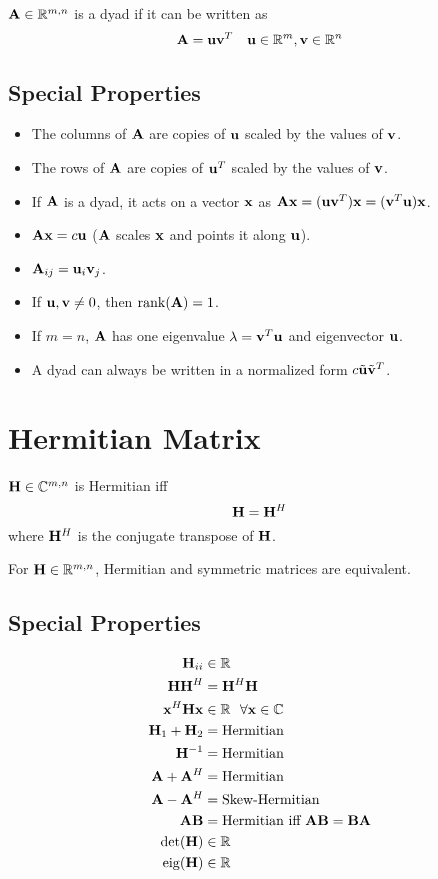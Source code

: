 $\mathbf{A}\in\mathbb{R}^{m,n}$ is a dyad if it can be written as
\begin{equation}
\mathbf{A}=\mathbf{u}\mathbf{v}^T~~~\mathbf{u}\in\mathbb{R}^{m}, \mathbf{v}\in\mathbb{R}^{n}
\end{equation}

\subsection*{Special Properties}
\begin{itemize}
\item The columns of $\mathbf{A}$ are copies of $\mathbf{u}$ scaled by the values of $\mathbf{v}$.
\item The rows of $\mathbf{A}$ are copies of $\mathbf{u}^T$ scaled by the values of $\mathbf{v}$.
\item If $\mathbf{A}$ is a dyad, it acts on a vector $\mathbf{x}$ as $\mathbf{A}\mathbf{x}=(\mathbf{u}\mathbf{v}^T)\mathbf{x}=(\mathbf{v}^T\mathbf{u})\mathbf{x}$.
\item $\mathbf{A}\mathbf{x}=c\mathbf{u}$ ($\mathbf{A}$ scales $\mathbf{x}$ and points it along $\mathbf{u}$).
\item $\mathbf{A}_{ij}=\mathbf{u}_i\mathbf{v}_j$.
\item If $\mathbf{u},\mathbf{v}\ne0$, then $\operatorname{rank}(\mathbf{A})=1$.
\item If $m=n$, $\mathbf{A}$ has one eigenvalue $\lambda=\mathbf{v}^T\mathbf{u}$ and eigenvector $\mathbf{u}$.
\item A dyad can always be written in a normalized form $c\tilde{\mathbf{u}}\tilde{\mathbf{v}}^T$.
\end{itemize}



\section{Hermitian Matrix}
$\mathbf{H}\in\mathbb{C}^{m,n}$ is Hermitian iff
\begin{equation}
\mathbf{H}=\mathbf{H}^H
\end{equation}
where $\mathbf{H}^H$ is the conjugate transpose of $\mathbf{H}$.

For $\mathbf{H}\in\mathbb{R}^{m,n}$, Hermitian and symmetric matrices are equivalent.

\subsection*{Special Properties}
\begin{align}
\mathbf{H}_{ii} &\in \mathbb{R}      \\
\mathbf{H}\mathbf{H}^H &=   \mathbf{H}^H\mathbf{H} \\
\mathbf{x}^H\mathbf{H}\mathbf{x} &\in \mathbb{R}~~\forall\mathbf{x}\in\mathbb{C} \\
\mathbf{H}_1+\mathbf{H}_2 &= \textrm{Hermitian} \\
\mathbf{H}^{-1}    &= \textrm{Hermitian} \\
\mathbf{A}+\mathbf{A}^H   &= \textrm{Hermitian} \\
\mathbf{A}-\mathbf{A}^H   &= \textrm{Skew-Hermitian} \\
\mathbf{A}\mathbf{B}      &= \textrm{Hermitian iff $\mathbf{A}\mathbf{B}=\mathbf{B}\mathbf{A}$} \\
\det(\mathbf{H})   &\in \mathbb{R} \\
\operatorname{eig}(\mathbf{H})   &\in \mathbb{R}
\end{align}


